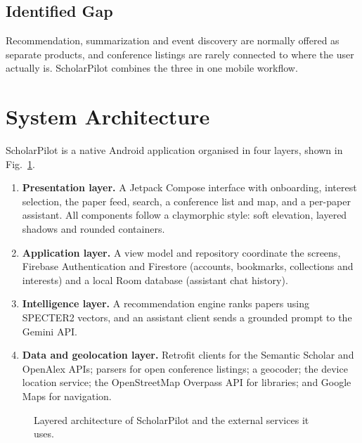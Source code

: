 \documentclass[conference]{IEEEtran}
\begin{document}
\subsection{Identified Gap}
Recommendation, summarization and event discovery are normally offered as separate products, and conference listings are rarely connected to where the user actually is. ScholarPilot combines the three in one mobile workflow.

\section{System Architecture}
ScholarPilot is a native Android application organised in four layers, shown in Fig.~\ref{fig:arch}.

\begin{enumerate}
    \item \textbf{Presentation layer.} A Jetpack Compose interface with onboarding, interest selection, the paper feed, search, a conference list and map, and a per-paper assistant. All components follow a claymorphic style: soft elevation, layered shadows and rounded containers.
    \item \textbf{Application layer.} A view model and repository coordinate the screens, Firebase Authentication and Firestore (accounts, bookmarks, collections and interests) and a local Room database (assistant chat history).
    \item \textbf{Intelligence layer.} A recommendation engine ranks papers using SPECTER2 vectors, and an assistant client sends a grounded prompt to the Gemini API.
    \item \textbf{Data and geolocation layer.} Retrofit clients for the Semantic Scholar and OpenAlex APIs; parsers for open conference listings; a geocoder; the device location service; the OpenStreetMap Overpass API for libraries; and Google Maps for navigation.
\end{enumerate}

\begin{figure}[!t]
    \centering
    \caption{Layered architecture of ScholarPilot and the external services it uses.}
    \label{fig:arch}
\end{figure}
\end{document}
